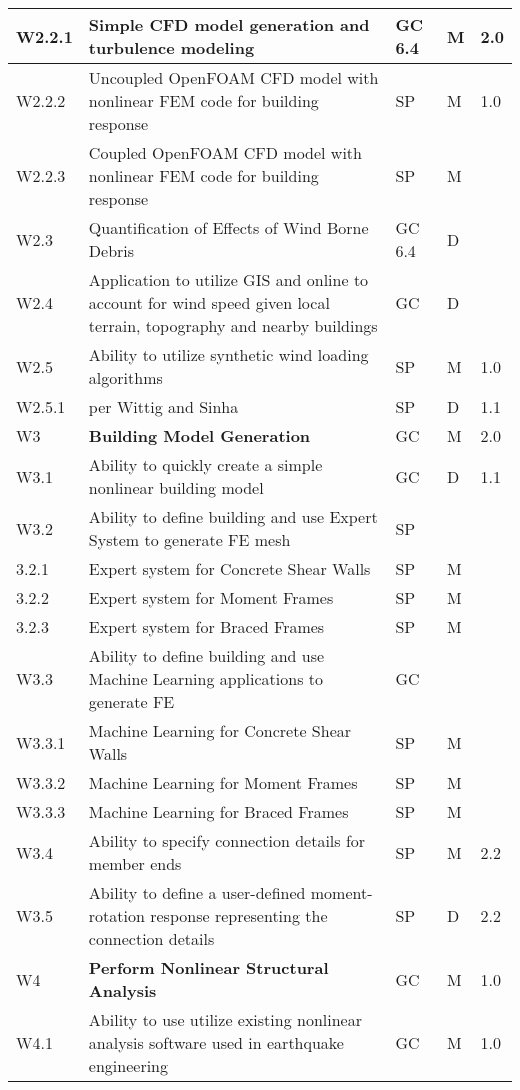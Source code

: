 \begin{longtable}{| p{} | p{} | p{} | p{} |  p{} |}
W2.2.1 & Simple CFD model generation and turbulence modeling & GC 6.4 & M & 2.0 \\ \hline
W2.2.2 & Uncoupled OpenFOAM CFD model with nonlinear FEM code for building response & SP & M & 1.0 \\ \hline
W2.2.3 & Coupled OpenFOAM CFD model with nonlinear FEM code for building response & SP & M &  \\ \hline
W2.3 & Quantification of Effects of Wind Borne Debris & GC 6.4 & D & \\ \hline
W2.4 & Application to utilize GIS and online to account for wind speed given local terrain, topography and nearby buildings & GC & D & \\ \hline
W2.5 & Ability to utilize synthetic wind loading algorithms & SP & M & 1.0  \\ \hline
W2.5.1 & per Wittig and Sinha & SP & D & 1.1  \\ \hline
W3 & \textbf{Building Model Generation} & GC & M & 2.0 \\ \hline
W3.1 & Ability to quickly create a simple nonlinear building model & GC & D & 1.1 \\ \hline
W3.2  & Ability to define building and use Expert System to generate FE mesh & SP & &  \\ \hline
	3.2.1 & Expert system for Concrete Shear Walls & SP & M &  \\ \hline
	3.2.2 & Expert system for Moment Frames & SP & M &  \\ \hline
	3.2.3 & Expert system for  Braced Frames & SP & M &   \\ \hline
W3.3 & Ability to define building and use Machine Learning applications to generate FE & GC &  &  \\ \hline
	W3.3.1 & Machine Learning for Concrete Shear Walls & SP & M &  \\ \hline
	W3.3.2 & Machine Learning for Moment Frames & SP & M &  \\ \hline
	W3.3.3 & Machine Learning for Braced Frames & SP & M &   \\ \hline
	W3.4 & Ability to specify connection details for member ends & SP & M & 2.2 \\ \hline
	W3.5 & Ability to define a user-defined moment-rotation response representing the connection details & SP & D & 2.2 \\ \hline
	W4 & \textbf{Perform Nonlinear Structural Analysis} & GC & M & 1.0 \\ \hline
W4.1 & Ability to use utilize existing nonlinear analysis software used in earthquake engineering & GC & M & 1.0 \\ \hline

\end{longtable}
